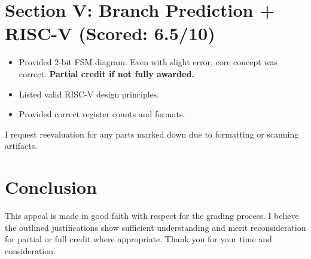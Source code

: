 \documentclass[11pt]{article}
\begin{document}
\section*{Section V: Branch Prediction + RISC-V (Scored: 6.5/10)}
\begin{itemize}[leftmargin=1.5em]
  \item Provided 2-bit FSM diagram. Even with slight error, core concept was correct. \textbf{Partial credit if not fully awarded.}
  \item Listed valid RISC-V design principles.
  \item Provided correct register counts and formats.
\end{itemize}
I request reevaluation for any parts marked down due to formatting or scanning artifacts.

\section*{Conclusion}
This appeal is made in good faith with respect for the grading process. I believe the outlined justifications show sufficient understanding and merit reconsideration for partial or full credit where appropriate. Thank you for your time and consideration.
\end{document}
